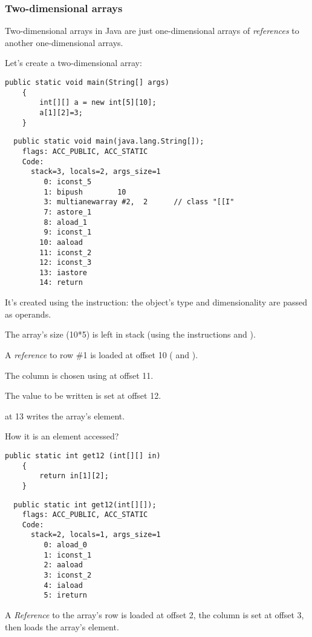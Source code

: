 \subsubsection{Two-dimensional arrays}

Two-dimensional arrays in Java are just one-dimensional arrays of \emph{references} to another 
one-dimensional arrays.


Let's create a two-dimensional array:

\begin{lstlisting}[style=customjava]
	public static void main(String[] args)
	{
		int[][] a = new int[5][10];
		a[1][2]=3;
	}
\end{lstlisting}

\begin{lstlisting}
  public static void main(java.lang.String[]);
    flags: ACC_PUBLIC, ACC_STATIC
    Code:
      stack=3, locals=2, args_size=1
         0: iconst_5      
         1: bipush        10
         3: multianewarray #2,  2      // class "[[I"
         7: astore_1      
         8: aload_1       
         9: iconst_1      
        10: aaload        
        11: iconst_2      
        12: iconst_3      
        13: iastore       
        14: return        
\end{lstlisting}

It's created using the  instruction: the object's type and dimensionality are passed
as operands.

The array's size (10*5) is left in stack (using the instructions  and ).


A \emph{reference} to row \#1 is loaded at offset 10 ( and ).

The column is chosen using  at offset 11.

The value to be written is set at offset 12.

 at 13 writes the array's element.


How it is an element accessed?

\begin{lstlisting}[style=customjava]
	public static int get12 (int[][] in)
	{
		return in[1][2];
	}
\end{lstlisting}

\begin{lstlisting}
  public static int get12(int[][]);
    flags: ACC_PUBLIC, ACC_STATIC
    Code:
      stack=2, locals=1, args_size=1
         0: aload_0       
         1: iconst_1      
         2: aaload        
         3: iconst_2      
         4: iaload        
         5: ireturn       
\end{lstlisting}

A \emph{Reference} to the array's row is loaded at offset 2, the column is set at offset 3, 
then  loads the array's element.

